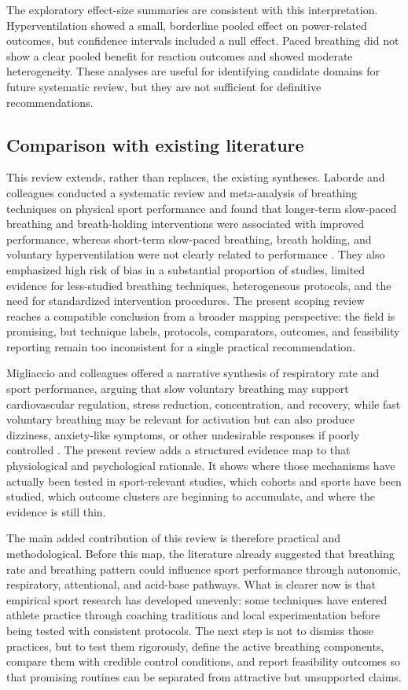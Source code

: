 \documentclass[11pt,a4paper]{article}
\begin{document}
The exploratory effect-size summaries are consistent with this interpretation. Hyperventilation showed a small, borderline pooled effect on power-related outcomes, but confidence intervals included a null effect. Paced breathing did not show a clear pooled benefit for reaction outcomes and showed moderate heterogeneity. These analyses are useful for identifying candidate domains for future systematic review, but they are not sufficient for definitive recommendations.

\subsection{Comparison with existing literature}
This review extends, rather than replaces, the existing syntheses. Laborde and colleagues conducted a systematic review and meta-analysis of breathing techniques on physical sport performance and found that longer-term slow-paced breathing and breath-holding interventions were associated with improved performance, whereas short-term slow-paced breathing, breath holding, and voluntary hyperventilation were not clearly related to performance \parencite{Laborde31122024}. They also emphasized high risk of bias in a substantial proportion of studies, limited evidence for less-studied breathing techniques, heterogeneous protocols, and the need for standardized intervention procedures. The present scoping review reaches a compatible conclusion from a broader mapping perspective: the field is promising, but technique labels, protocols, comparators, outcomes, and feasibility reporting remain too inconsistent for a single practical recommendation.

Migliaccio and colleagues offered a narrative synthesis of respiratory rate and sport performance, arguing that slow voluntary breathing may support cardiovascular regulation, stress reduction, concentration, and recovery, while fast voluntary breathing may be relevant for activation but can also produce dizziness, anxiety-like symptoms, or other undesirable responses if poorly controlled \parencite{sports11050103}. The present review adds a structured evidence map to that physiological and psychological rationale. It shows where those mechanisms have actually been tested in sport-relevant studies, which cohorts and sports have been studied, which outcome clusters are beginning to accumulate, and where the evidence is still thin.

The main added contribution of this review is therefore practical and methodological. Before this map, the literature already suggested that breathing rate and breathing pattern could influence sport performance through autonomic, respiratory, attentional, and acid-base pathways. What is clearer now is that empirical sport research has developed unevenly: some techniques have entered athlete practice through coaching traditions and local experimentation before being tested with consistent protocols. The next step is not to dismiss those practices, but to test them rigorously, define the active breathing components, compare them with credible control conditions, and report feasibility outcomes so that promising routines can be separated from attractive but unsupported claims.
\end{document}

